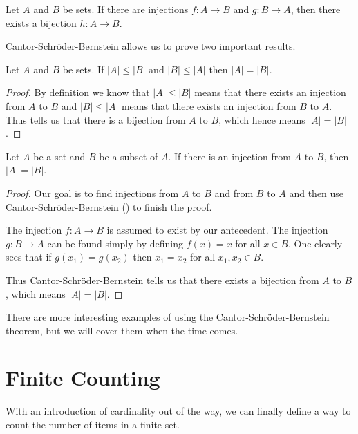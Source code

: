 \begin{theorem}\label{theorem:cantor-schroder-bernstein}
    Let $A$ and $B$ be sets. If there are injections $f: A \to B$ and $g: B \to A$, then there exists a bijection $h: A \to B$.
\end{theorem}

Cantor-Schr\"oder-Bernstein allows us to prove two important results.

\begin{corollary}\label{corollary:cantor-schroder-bernstein-corollary}
    Let $A$ and $B$ be sets. If $|A| \leq |B|$ and $|B| \leq |A|$ then $|A| = |B|$.
\end{corollary}
\begin{proof}
    By definition we know that $|A| \leq |B|$ means that there exists an injection from $A$ to $B$ and $|B| \leq |A|$ means that there exists an injection from $B$ to $A$. Thus  tells us that there is a bijection from $A$ to $B$, which hence means $|A| = |B|$.
\end{proof}

\begin{corollary}\label{corollary:injection-into-subset-means-equinumerous}
    Let $A$ be a set and $B$ be a subset of $A$. If there is an injection from $A$ to $B$, then $|A| = |B|$.
\end{corollary}
\begin{proof}
    Our goal is to find injections from $A$ to $B$ and from $B$ to $A$ and then use Cantor-Schr\"oder-Bernstein () to finish the proof.

    The injection $f: A \to B$ is assumed to exist by our antecedent. The injection $g: B \to A$ can be found simply by defining $f(x) = x$ for all $x \in B$. One clearly sees that if $g(x_1) = g(x_2)$ then $x_1 = x_2$ for all $x_1, x_2 \in B$.

    Thus Cantor-Schr\"oder-Bernstein tells us that there exists a bijection from $A$ to $B$, which means $|A| = |B|$.
\end{proof}

There are more interesting examples of using the Cantor-Schr\"oder-Bernstein theorem, but we will cover them when the time comes.

\section{Finite Counting}
With an introduction of cardinality out of the way, we can finally define a way to count the number of items in a finite set.


